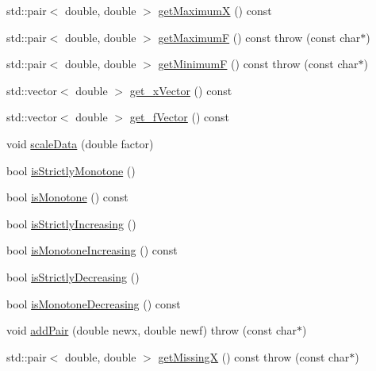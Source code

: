 \begin{DoxyCompactItemize}
std\+::pair$<$ double, double $>$ \hyperlink{class_opm_1_1_monot_cubic_interpolator_a653d28fd284318da18dde0e092c17109}{get\+Maximum\+X} () const 
\item 
std\+::pair$<$ double, double $>$ \hyperlink{class_opm_1_1_monot_cubic_interpolator_aa9c7fc234139d6a09b140c22461a4233}{get\+Maximum\+F} () const   throw (const char$\ast$)
\item 
std\+::pair$<$ double, double $>$ \hyperlink{class_opm_1_1_monot_cubic_interpolator_aa9e901d08354fc7f96340e8985171882}{get\+Minimum\+F} () const   throw (const char$\ast$)
\item 
std\+::vector$<$ double $>$ \hyperlink{class_opm_1_1_monot_cubic_interpolator_ada882d70e9149f4bfa5f7f4d5118480a}{get\+\_\+x\+Vector} () const 
\item 
std\+::vector$<$ double $>$ \hyperlink{class_opm_1_1_monot_cubic_interpolator_ab9940de57be4671201a96dab55ccb8a1}{get\+\_\+f\+Vector} () const 
\item 
void \hyperlink{class_opm_1_1_monot_cubic_interpolator_ab2ea032189594f43357b6ea53cd0aa1e}{scale\+Data} (double factor)
\item 
bool \hyperlink{class_opm_1_1_monot_cubic_interpolator_a5c038e58cc6b06cceb0933743bdbcd0b}{is\+Strictly\+Monotone} ()
\item 
bool \hyperlink{class_opm_1_1_monot_cubic_interpolator_a07f1efb0f4740087f0388e18dabc44df}{is\+Monotone} () const 
\item 
bool \hyperlink{class_opm_1_1_monot_cubic_interpolator_adbdc068cc30c1496610d12f6f73f1306}{is\+Strictly\+Increasing} ()
\item 
bool \hyperlink{class_opm_1_1_monot_cubic_interpolator_af77b7dc3389dac4f0d8fb6a81b9e976b}{is\+Monotone\+Increasing} () const 
\item 
bool \hyperlink{class_opm_1_1_monot_cubic_interpolator_a05cb94dbbafa98918518c64226a7d7ca}{is\+Strictly\+Decreasing} ()
\item 
bool \hyperlink{class_opm_1_1_monot_cubic_interpolator_a176828cbeabb928ce5626fd3205f6bad}{is\+Monotone\+Decreasing} () const 
\item 
void \hyperlink{class_opm_1_1_monot_cubic_interpolator_a6bdbc5403259458f5e7d90d3b77e25a6}{add\+Pair} (double newx, double newf)  throw (const char$\ast$)
\item 
std\+::pair$<$ double, double $>$ \hyperlink{class_opm_1_1_monot_cubic_interpolator_a80670052827881e3d1c45effa60d5d78}{get\+Missing\+X} () const   throw (const char$\ast$)
\item 

\end{DoxyCompactItemize}
